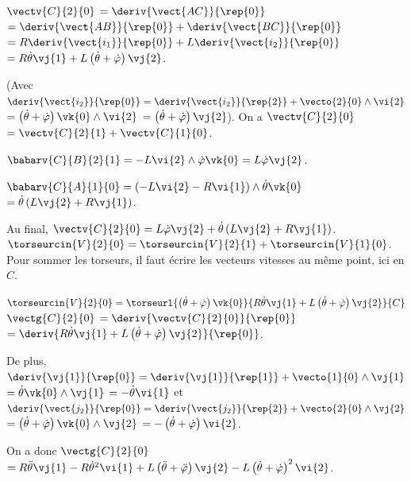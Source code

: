 \begin{corrigebox}
$\vectv{C}{2}{0}$ $ = \deriv{\vect{AC}}{\rep{0}}$
$ = \deriv{\vect{AB}}{\rep{0}}+\deriv{\vect{BC}}{\rep{0}}$
$ = R\deriv{\vect{i_1}}{\rep{0}}+L\deriv{\vect{i_2}}{\rep{0}}$
$ = R\dot{\theta}\vj{1}+L\left( \dot{\theta}+\dot{\varphi}\right)\vj{2}$.

(Avec $\deriv{\vect{i_2}}{\rep{0}} = \deriv{\vect{i_2}}{\rep{2}} + \vecto{2}{0}\wedge \vi{2}$
$ = \left( \dot{\theta}+\dot{\varphi}\right)\vk{0}\wedge \vi{2}$ $ = \left( \dot{\theta}+\dot{\varphi}\right)\vj{2}$).
On a $\vectv{C}{2}{0} $ $= \vectv{C}{2}{1}+\vectv{C}{1}{0}$.

$\babarv{C}{B}{2}{1} = -L\vi{2}\wedge \dot{\varphi}\vk{0}= L\dot{\varphi}\vj{2}$.

$\babarv{C}{A}{1}{0} = \left( -L\vi{2} -R\vi{1}\right)\wedge  \dot{\theta}\vk{0}$
$=\dot{\theta}\left( L\vj{2} +R\vj{1}\right)$.

Au final, $\vectv{C}{2}{0} = L\dot{\varphi}\vj{2} + \dot{\theta}\left( L\vj{2} +R\vj{1}\right)$.
$\torseurcin{V}{2}{0}=\torseurcin{V}{2}{1}+\torseurcin{V}{1}{0}$. Pour sommer les torseurs, il faut écrire les vecteurs vitesses au même point, ici en $C$. 

$\torseurcin{V}{2}{0}=\torseurl{ \left( \dot{\theta}+\dot{\varphi}\right)\vk{0}}{R\dot{\theta}\vj{1}+L\left( \dot{\theta}+\dot{\varphi}\right)\vj{2}}{C}$
$\vectg{C}{2}{0}$ $ = \deriv{\vectv{C}{2}{0}}{\rep{0}}$ $= \deriv{R\dot{\theta}\vj{1}+L\left( \dot{\theta}+\dot{\varphi}\right)\vj{2}}{\rep{0}}$.

De plus,  $\deriv{\vj{1}}{\rep{0}} = \deriv{\vj{1}}{\rep{1}} + \vecto{1}{0}\wedge \vj{1}$
$ =\dot{\theta}\vk{0} \wedge \vj{1} $ $=-\dot{\theta}\vi{1}$ et 
$\deriv{\vect{j_2}}{\rep{0}} = \deriv{\vect{j_2}}{\rep{2}} + \vecto{2}{0}\wedge \vj{2}$
$ = \left( \dot{\theta}+\dot{\varphi}\right)\vk{0}\wedge \vj{2}$ $ = -\left( \dot{\theta}+\dot{\varphi}\right)\vi{2}$.

On a donc $\vectg{C}{2}{0}$ $=R\ddot{\theta}\vj{1}-R\dot{\theta}^2\vi{1}+L\left( \ddot{\theta}+\ddot{\varphi}\right)\vj{2}-L\left( \dot{\theta}+\dot{\varphi}\right)^2\vi{2}$.
\end{corrigebox}

